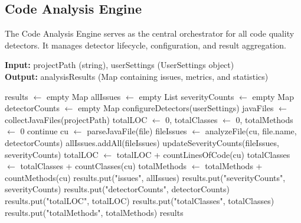 \documentclass[12pt,a4paper]{article}
\begin{document}
    \subsection{Code Analysis Engine}

    The Code Analysis Engine serves as the central orchestrator for all code quality detectors. It manages detector lifecycle, configuration, and result aggregation.

    \begin{algorithm}[H]
        \caption{analyzeProject}
        \textbf{Input:} projectPath (string), userSettings (UserSettings object)\\
        \textbf{Output:} analysisResults (Map containing issues, metrics, and statistics)
        \begin{algorithmic}[1]
            \State results $\gets$ empty Map
            \State allIssues $\gets$ empty List
            \State severityCounts $\gets$ empty Map
            \State detectorCounts $\gets$ empty Map
            \State configureDetectors(userSettings)
            \State javaFiles $\gets$ collectJavaFiles(projectPath)
            \State totalLOC $\gets$ 0, totalClasses $\gets$ 0, totalMethods $\gets$ 0
                    \State continue
                \EndIf
                \State cu $\gets$ parseJavaFile(file)
                    \State fileIssues $\gets$ analyzeFile(cu, file.name, detectorCounts)
                    \State allIssues.addAll(fileIssues)
                    \State updateSeverityCounts(fileIssues, severityCounts)
                    \State totalLOC $\gets$ totalLOC + countLinesOfCode(cu)
                    \State totalClasses $\gets$ totalClasses + countClasses(cu)
                    \State totalMethods $\gets$ totalMethods + countMethods(cu)
                \EndIf
            \EndFor
            \State results.put("issues", allIssues)
            \State results.put("severityCounts", severityCounts)
            \State results.put("detectorCounts", detectorCounts)
            \State results.put("totalLOC", totalLOC)
            \State results.put("totalClasses", totalClasses)
            \State results.put("totalMethods", totalMethods)
            \Return results
        \end{algorithmic}
    \end{algorithm}
\end{document}
